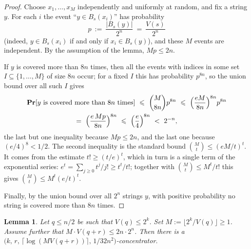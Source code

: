 \documentclass[11pt,a4paper]{article}
\newtheorem{lemma}[theorem]{Lemma}
\theoremstyle{definition}
\renewcommand{\Pr}{\mathbf{Pr}}
\renewcommand{\le}{\leqslant}
\renewcommand{\ge}{\geqslant}
\begin{document}
\begin{proof}
Choose $x_1,\dots,x_M$ independently and uniformly at random, and fix a string
$y$. For each $i$ the event ``$y\in B_s(x_i)$'' has probability
\[
  p\ :=\ \frac{|B_s(y)|}{2^n}\ =\ \frac{V(s)}{2^n}
\]
(indeed, $y\in B_s(x_i)$ if and only if $x_i\in B_s(y)$), and these $M$ events
are independent. By the assumption of the lemma, $Mp\le2n$.

If $y$ is covered more than $8n$ times, then all the events with indices in
some set $I\subseteq\{1,\dots,M\}$ of size $8n$ occur; for a fixed $I$ this has
probability $p^{8n}$, so the union bound over all such $I$ gives
\begin{multline*}
  \Pr[\text{$y$ is covered more than $8n$ times}]\ \le\
  \binom{M}{8n}p^{8n}\ \le\ \Bigl(\frac{eM}{8n}\Bigr)^{8n}p^{8n}\\
  =\ \Bigl(\frac{e\,Mp}{8n}\Bigr)^{8n}\ \le\
  \Bigl(\frac{e}{4}\Bigr)^{8n}\ <\ 2^{-n},
\end{multline*}
the last but one inequality because $Mp\le2n$, and the last one because
$(e/4)^8<1/2$. The second inequality is the standard bound $\binom Mt\le(eM/t)^t$.
It comes from the estimate
$t!\ge(t/e)^t$, which in turn is a single term of the exponential series:
$e^t=\sum_{j\ge0}t^j/j!\ge t^t/t!$; together with $\binom Mt\le M^t/t!$ this
gives $\binom Mt\le M^t(e/t)^t$.

Finally, by the union bound over all $2^n$ strings $y$, with positive
probability no string is covered more than $8n$ times.
\end{proof}

\begin{lemma}\label{lem:construct}
Let $q\le n/2$ be such that $V(q)\le2^k$. Set  $M:=\lfloor2^k/V(q)\rfloor\ge1$.
Assume further that 
$M\cdot V(q+r)\le2n\cdot2^n$. Then there is a
$\bigl(k,\,r,\,\lceil\log (M V(q+r))\rceil,\,1/32n^2\bigr)$-concentrator.
\end{lemma}
\end{document}
